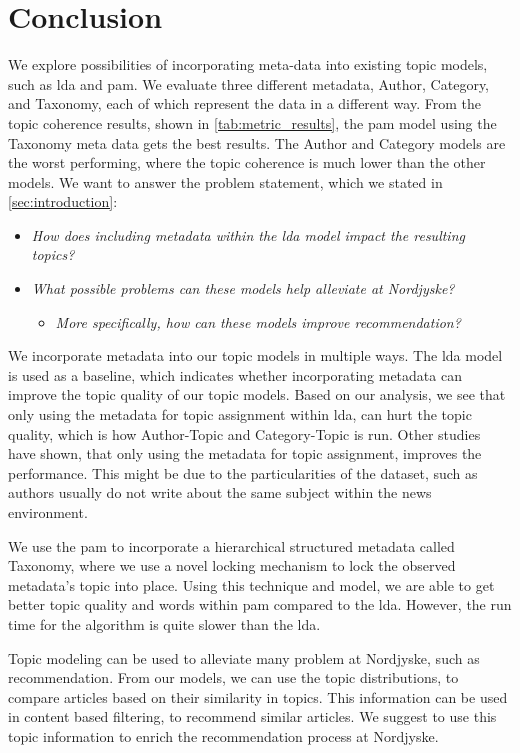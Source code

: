 \section{Conclusion}\label{sec:conclusion}
We explore possibilities of incorporating meta-data into existing topic models, such as \gls{lda} and \gls{pam}.
We evaluate three different metadata, Author, Category, and Taxonomy, each of which represent the data in a different way.
From the topic coherence results, shown in \autoref{tab:metric_results}, the \gls{pam} model using the Taxonomy meta data gets the best results.
The Author and Category models are the worst performing, where the topic coherence is much lower than the other models.
We want to answer the problem statement, which we stated in \autoref{sec:introduction}:

\begin{itemize}
	\item \textit{How does including metadata within the \gls{lda} model impact the resulting topics?}
	\item \textit{What possible problems can these models help alleviate at Nordjyske?}
	\begin{itemize}
		\item \textit{More specifically, how can these models improve recommendation?}
	\end{itemize}
\end{itemize}

We incorporate metadata into our topic models in multiple ways.
The \gls{lda} model is used as a baseline, which indicates whether incorporating metadata can improve the topic quality of our topic models.
Based on our analysis, we see that only using the metadata for topic assignment within \gls{lda}, can hurt the topic quality, which is how Author-Topic and Category-Topic is run.
Other studies have shown, that only using the metadata for topic assignment, improves the performance.
This might be due to the particularities of the dataset, such as authors usually do not write about the same subject within the news environment.  

We use the \gls{pam} to incorporate a hierarchical structured metadata called Taxonomy, where we use a novel locking mechanism to lock the observed metadata's topic into place.
Using this technique and model, we are able to get better topic quality and words within \gls{pam} compared to the \gls{lda}.
However, the run time for the algorithm is quite slower than the \gls{lda}.

Topic modeling can be used to alleviate many problem at Nordjyske, such as recommendation.
From our models, we can use the topic distributions, to compare articles based on their similarity in topics. 
This information can be used in content based filtering, to recommend similar articles.
We suggest to use this topic information to enrich the recommendation process at Nordjyske. 
